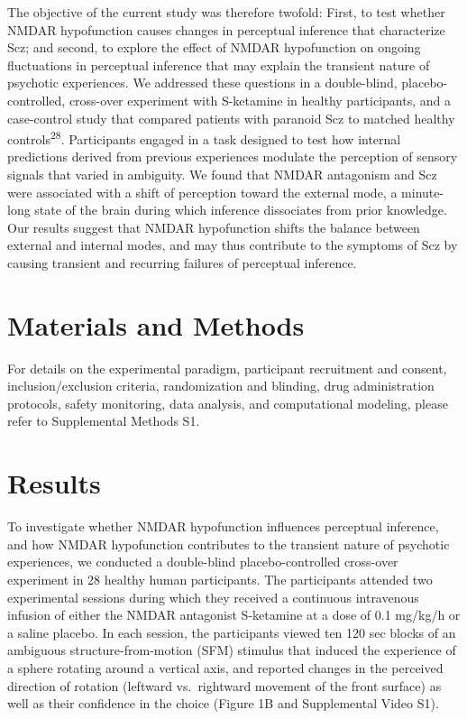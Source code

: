 \documentclass[
]{article}
\begin{document}
The objective of the current study was therefore twofold: First, to test
whether NMDAR hypofunction causes changes in perceptual inference that
characterize Scz; and second, to explore the effect of NMDAR
hypofunction on ongoing fluctuations in perceptual inference that may
explain the transient nature of psychotic experiences. We addressed
these questions in a double-blind, placebo-controlled, cross-over
experiment with S-ketamine in healthy participants, and a case-control
study that compared patients with paranoid Scz to matched healthy
controls\textsuperscript{28}. Participants engaged in a task designed to
test how internal predictions derived from previous experiences modulate
the perception of sensory signals that varied in ambiguity. We found
that NMDAR antagonism and Scz were associated with a shift of perception
toward the external mode, a minute-long state of the brain during which
inference dissociates from prior knowledge. Our results suggest that
NMDAR hypofunction shifts the balance between external and internal
modes, and may thus contribute to the symptoms of Scz by causing
transient and recurring failures of perceptual inference.

\section{Materials and Methods}\label{materials-and-methods}

For details on the experimental paradigm, participant recruitment and
consent, inclusion/exclusion criteria, randomization and blinding, drug
administration protocols, safety monitoring, data analysis, and
computational modeling, please refer to Supplemental Methods S1.

\section{Results}\label{results}

To investigate whether NMDAR hypofunction influences perceptual
inference, and how NMDAR hypofunction contributes to the transient
nature of psychotic experiences, we conducted a double-blind
placebo-controlled cross-over experiment in 28 healthy human
participants. The participants attended two experimental sessions during
which they received a continuous intravenous infusion of either the
NMDAR antagonist S-ketamine at a dose of 0.1 mg/kg/h or a saline
placebo. In each session, the participants viewed ten 120 sec blocks of
an ambiguous structure-from-motion (SFM) stimulus that induced the
experience of a sphere rotating around a vertical axis, and reported
changes in the perceived direction of rotation (leftward vs.~rightward
movement of the front surface) as well as their confidence in the choice
(Figure 1B and Supplemental Video S1).
\end{document}
